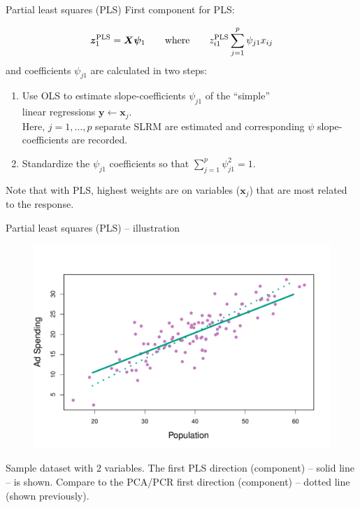 \documentclass{beamer}
\begin{document}
\begin{frame}{Partial least squares (PLS)}
First component for PLS:

$$ \bm{z}_1^{\textnormal{PLS}} = \bm{X\psi}_1 \qquad \textnormal{where} \qquad 
z_{i1}^{\textnormal{PLS}} \sum_{j=1}^p \psi_{j1} x_{ij}$$
\medskip
and coefficients $\psi_{j1}$ are calculated in two steps:
\begin{enumerate}
\item Use OLS to estimate slope-coefficients $\psi_{j1}$ of the ``simple'' \\linear regressions $\bm{y} \leftarrow \bm{x}_j$.\\ \smallskip Here, $j=1,\dots,p$ separate SLRM are estimated and corresponding $\psi$ slope-coefficients are recorded.
\medskip
\item Standardize the $\psi_{j1}$ coefficients so that $\sum_{j=1}^p \psi_{j1}^2=1$.
\end{enumerate}
\bigskip
Note that with PLS, highest weights are on variables ($\bm{x}_j$) that are most related to the response. 
\end{frame}
\begin{frame}{Partial least squares (PLS) -- illustration}
\vspace{-1.2cm}
\begin{figure}
\includegraphics[scale=0.50]{IMG/PCAExample5.pdf}
\end{figure}
\vspace{-0.6cm}
\centering Sample dataset with 2 variables. The first PLS direction (component) -- solid line -- is shown. Compare to the PCA/PCR first direction (component) -- dotted line (shown previously).
\end{frame}
\end{document}
